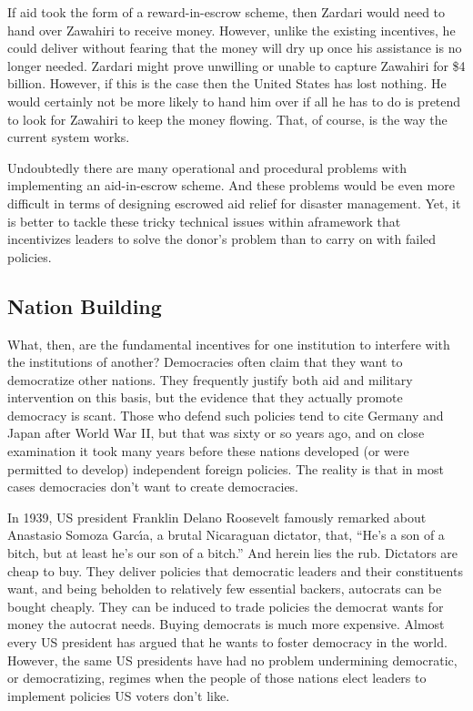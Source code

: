 \documentclass[10pt]{article}
\begin{document}
{\large If aid took the form of a reward-in-escrow scheme, then Zardari would
need to hand over Zawahiri to receive money. However, unlike the existing
incentives, he could deliver without fearing that the money will dry up once his
assistance is no longer needed. Zardari might prove unwilling or unable to
capture Zawahiri for \$4 billion. However, if this is the case then the United
States has lost nothing. He would certainly not be more likely to hand him over
if all he has to do is pretend to look for Zawahiri to keep the money flowing.
That, of course, is the way the current system works.}

{\large Undoubtedly there are many operational and procedural problems with
implementing an aid-in-escrow scheme. And these problems would be even more
difficult in terms of designing escrowed aid relief for disaster management. Yet,
it is better to tackle these tricky technical issues within aframework that
incentivizes leaders to solve the donor's problem than to carry on with failed
policies.}

\subsection{Nation Building}
{\large  }
{\large What, then, are the fundamental incentives for one institution to
interfere with the institutions of another? Democracies often claim that they
want to democratize other nations. They frequently justify both aid and military
intervention on this basis, but the evidence that they actually promote democracy
is scant. Those who defend such policies tend to cite Germany and Japan after
World War II, but that was sixty or so years ago, and on close examination it
took many years before these nations developed (or were permitted to develop)
independent foreign policies. The reality is that in most cases democracies don't
want to create democracies.}

{\large In 1939, US president Franklin Delano Roosevelt famously remarked about
Anastasio Somoza Garc\'{\i}a, a brutal Nicaraguan dictator, that, ``He's a son of
a bitch, but at least he's our son of a bitch.'' And herein lies the rub.
Dictators are cheap to buy. They deliver policies that democratic leaders and
their constituents want, and being beholden to relatively few essential backers,
autocrats can be bought cheaply. They can be induced to trade policies the
democrat wants for money the autocrat needs. Buying democrats is much more
expensive. Almost every US president has argued that he wants to foster democracy
in the world. However, the same US presidents have had no problem undermining
democratic, or democratizing, regimes when the people of those nations elect
leaders to implement policies US voters don't like.}
\end{document}
